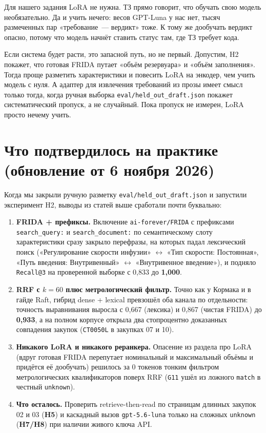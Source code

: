 \documentclass[11pt,a4paper]{article}
\begin{document}
Для нашего задания LoRA не нужна. ТЗ прямо говорит, что обучать свою модель необязательно. Да и учить нечего: весов GPT-Luna у нас нет, тысяч размеченных пар «требование~--- вердикт» тоже. К тому же дообучать вердикт опасно, потому что модель начнёт ставить статус там, где ТЗ требует кода.

Если система будет расти, это запасной путь, но не первый. Допустим, H2 покажет, что готовая FRIDA путает «объём резервуара» и «объём заполнения». Тогда проще разметить характеристики и повесить LoRA на энкодер, чем учить модель с нуля. А адаптер для извлечения требований из прозы имеет смысл только тогда, когда ручная выборка \texttt{eval/held\_out\_draft.json} покажет систематический пропуск, а не случайный. Пока пропуск не измерен, LoRA просто нечему учить.

\section{Что подтвердилось на практике (обновление от 6 ноября 2026)}

Когда мы закрыли ручную разметку \nolinkurl{eval/held_out_draft.json} и запустили эксперимент H2, выводы из статей выше сработали почти буквально:

\begin{enumerate}
  \item \textbf{FRIDA + префиксы.} Включение \nolinkurl{ai-forever/FRIDA} с префиксами \nolinkurl{search_query:} и \nolinkurl{search_document:} по семантическому слоту характеристики сразу закрыло перефразы, на которых падал лексический поиск («Регулирование скорости инфузии» $\leftrightarrow$ «Тип скорости: Постоянная», «Путь введения: Внутривенный» $\leftrightarrow$ «Внутривенное введение»), и подняло \texttt{Recall@3} на проверенной выборке с 0,833 до \textbf{1,000}.
  \item \textbf{RRF с $k = 60$ плюс метрологический фильтр.} Точно как у Кормака и в гайде Raft, гибрид dense + lexical превзошёл оба канала по отдельности: точность выравнивания выросла с 0,667 (лексика) и 0,867 (чистая FRIDA) до \textbf{0,933}, а на полном корпусе открыла два стопроцентно доказанных совпадения закупок (\texttt{CT0050L} в закупках 07 и 10).
  \item \textbf{Никакого LoRA и никакого реранкера.} Опасение из раздела про LoRA (вдруг готовая FRIDA перепутает номинальный и максимальный объёмы и придётся её дообучать) решилось за 0 токенов тонким фильтром метрологических квалификаторов поверх RRF (\texttt{G11} ушёл из ложного \texttt{match} в честный \texttt{unknown}).
  \item \textbf{Что осталось.} Проверить retrieve-then-read по страницам длинных закупок 02 и 03 (\textbf{H5}) и каскадный вызов \texttt{gpt-5.6-luna} только на сложных \texttt{unknown} (\textbf{H7/H8}) при наличии живого ключа API.
\end{enumerate}
\end{document}

